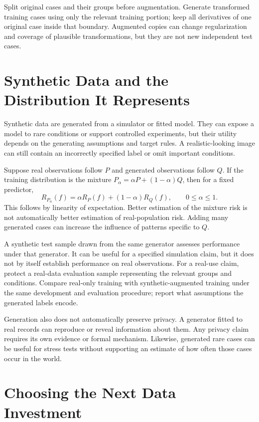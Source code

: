 Split original cases and their groups before augmentation. Generate transformed training cases using only the relevant training portion; keep all derivatives of one original case inside that boundary. Augmented copies can change regularization and coverage of plausible transformations, but they are not new independent test cases.

\section{Synthetic Data and the Distribution It Represents}

Synthetic data are generated from a simulator or fitted model. They can expose a model to rare conditions or support controlled experiments, but their utility depends on the generating assumptions and target rules. A realistic-looking image can still contain an incorrectly specified label or omit important conditions.

Suppose real observations follow $P$ and generated observations follow $Q$. If the training distribution is the mixture $P_\alpha=\alpha P+(1-\alpha)Q$, then for a fixed predictor,
\[
R_{P_\alpha}(f)=\alpha R_P(f)+(1-\alpha)R_Q(f),
\qquad0\le\alpha\le1.
\]
This follows by linearity of expectation. Better estimation of the mixture risk is not automatically better estimation of real-population risk. Adding many generated cases can increase the influence of patterns specific to $Q$.

A synthetic test sample drawn from the same generator assesses performance under that generator. It can be useful for a specified simulation claim, but it does not by itself establish performance on real observations. For a real-use claim, protect a real-data evaluation sample representing the relevant groups and conditions. Compare real-only training with synthetic-augmented training under the same development and evaluation procedure; report what assumptions the generated labels encode.

Generation also does not automatically preserve privacy. A generator fitted to real records can reproduce or reveal information about them. Any privacy claim requires its own evidence or formal mechanism. Likewise, generated rare cases can be useful for stress tests without supporting an estimate of how often those cases occur in the world.

\section{Choosing the Next Data Investment}

